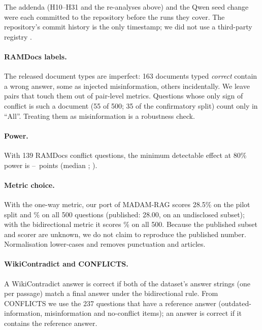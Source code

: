 The addenda (H10--H31 and the re-analyses above) and the Qwen seed change were each committed to the repository before
the runs they cover. The repository's commit history is the only timestamp; we did not use a third-party registry
\citep{vanmiltenburg2021preregistering}.

\paragraph{RAMDocs labels.} The released document types are imperfect: 163 documents typed \emph{correct} contain a
wrong answer, some as injected misinformation, others incidentally. We leave pairs that touch them out of pair-level
metrics. Questions whose only sign of conflict is such a document (55 of 500; 35 of the confirmatory split) count
only in ``All''. Treating them as misinformation is a robustness check.

\paragraph{Power.} With 139 RAMDocs conflict questions, the minimum detectable effect at 80\% power is
\mdeLo--\mdeHi\ points (median \mdeMed; \citealp{card2020power}).

\paragraph{Metric choice.} With the one-way metric, our port of MADAM-RAG scores 28.5\% on the pilot split and
\madamOneWay\% on all 500 questions (published: 28.00, on an undisclosed subset); with the bidirectional metric it
scores \madamBidir\% on all 500. Because the published subset and scorer are unknown, we do not claim to reproduce the
published number. Normalisation lower-cases and removes punctuation and articles.

\paragraph{WikiContradict and CONFLICTS.} A WikiContradict answer is correct if both of the dataset's answer strings
(one per passage) match a final answer under the bidirectional rule. From CONFLICTS we use the 237 questions that
have a reference answer (outdated-information, misinformation and no-conflict items); an answer is correct if it
contains the reference answer.

